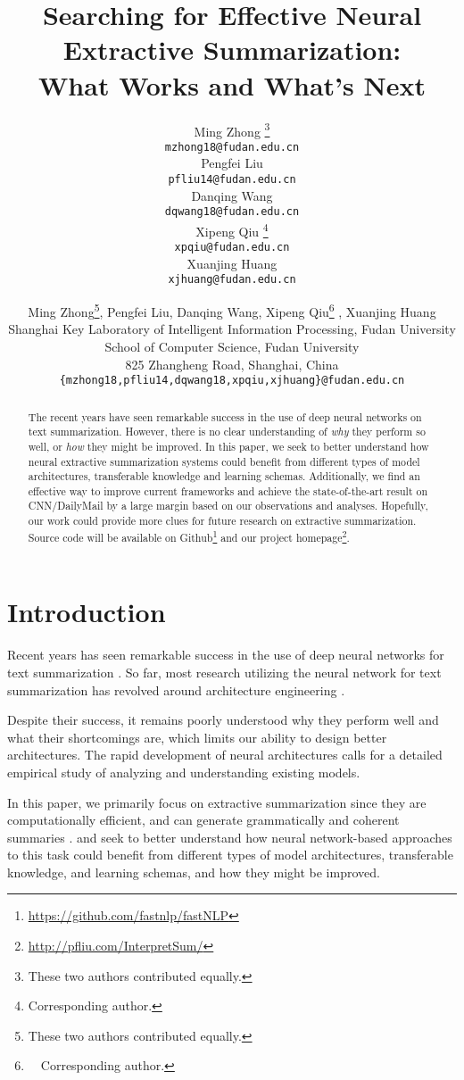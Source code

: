 \documentclass[11pt,a4paper]{article}
\title{Searching for Effective Neural Extractive Summarization: \\ What Works and What's Next}
\author{Ming Zhong \thanks{\hspace{1mm} These two authors contributed equally.}\\
  \texttt{mzhong18@fudan.edu.cn} \\ \And
  Pengfei Liu \samethanks\\
  \texttt{pfliu14@fudan.edu.cn} \\ \And
  Danqing Wang \\
  \texttt{dqwang18@fudan.edu.cn} \\   \AND
  Xipeng Qiu \thanks{\hspace{1mm} Corresponding author.} \\
  \texttt{xpqiu@fudan.edu.cn} \\ \And
  Xuanjing Huang \\
  \texttt{xjhuang@fudan.edu.cn}
  }
\author{Ming Zhong\thanks{\hspace{1mm} These two authors contributed equally.}, Pengfei Liu\samethanks, Danqing Wang, Xipeng Qiu\thanks{\ \  Corresponding author.} ,  Xuanjing Huang \\
  Shanghai Key Laboratory of Intelligent Information Processing, Fudan University \\
  School of Computer Science, Fudan University \\
  825 Zhangheng Road, Shanghai, China \\
  \texttt{\{mzhong18,pfliu14,dqwang18,xpqiu,xjhuang\}@fudan.edu.cn} }
\begin{document}
\maketitle



\begin{abstract}

    The recent years have seen remarkable success in the use of deep neural networks on text summarization.
    However, there is no clear understanding of \textit{why} they perform so well, or \textit{how} they might be improved.
    In this paper, we seek to better understand how neural extractive summarization systems could benefit from different types of model architectures, transferable knowledge and learning schemas. Additionally, we find an effective way to improve current frameworks and achieve the state-of-the-art result on CNN/DailyMail by a large margin based on our observations and analyses. Hopefully, our work could provide more clues for future research on extractive summarization.
    Source code will be available on Github\footnote{\url{https://github.com/fastnlp/fastNLP}} and our project homepage\footnote{\url{http://pfliu.com/InterpretSum/}}.


\end{abstract}



\section{Introduction}




Recent years has seen remarkable success in the use of deep neural networks for text summarization \cite{see2017get, celikyilmaz2018deep, jadhav2018extractive}.
So far, most research utilizing the neural network for text summarization has revolved around architecture engineering \cite{zhou2018neural, chen2018fast, gehrmann2018bottom}.


Despite their success, it remains poorly understood  why they perform well and what their shortcomings are, which limits our ability to design better architectures.
The rapid development of neural architectures calls for a detailed empirical study of analyzing and understanding existing models.

In this paper, we primarily focus on extractive summarization since they are computationally efficient, and can generate grammatically and coherent summaries \cite{nallapati2017summarunner}.
and seek to better understand how neural network-based approaches to this task could benefit from different types of model architectures, transferable knowledge, and learning schemas, and how they might be improved.
\end{document}
